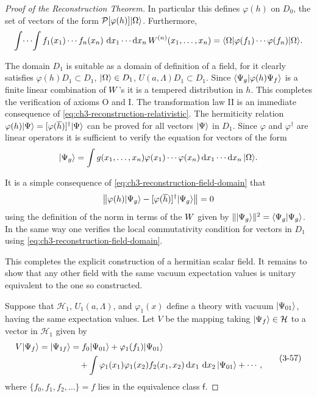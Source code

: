 \begin{proof}[Proof of the Reconstruction Theorem]
In particular this defines \(\varphi(h)\) on \(D_0\), the set of vectors of
the form \(\mathcal{P}[\varphi(h)]\lvert \Omega\rangle\).  Furthermore,
\begin{equation*}
\int\!\cdots\!\int f_1(x_1)\cdots f_n(x_n)\,
\mathop{}\!\mathrm{d} x_1\cdots\mathop{}\!\mathrm{d} x_n\,W^{(n)}(x_1,\ldots,x_n)
 =\langle \Omega\rvert\varphi(f_1)\cdots\varphi(f_n)\lvert \Omega\rangle .
\end{equation*}

The domain \(D_1\) is suitable as a domain of definition of a field, for it
clearly satisfies \(\varphi(h)D_1\subset D_1\),
\(\lvert \Omega\rangle\in D_1\), \(U(a,\Lambda)D_1\subset D_1\).  Since
\(\langle \Psi_g\vert \varphi(h)\Psi_f\rangle\) is a finite linear combination of
\(W\)'s it is a tempered distribution in \(h\).  This completes the
verification of axioms O and I.  The transformation law II is an immediate
consequence of \eqref{eq:ch3-reconstruction-relativistic}.  The hermiticity relation
\(\varphi(h)\lvert \Psi\rangle=[\varphi(\overline h)]^\dagger\lvert \Psi\rangle\) can be
proved for all vectors \(\lvert \Psi\rangle\) in \(D_1\).  Since \(\varphi\) and
\(\varphi^\dagger\) are linear operators it is sufficient to verify the
equation for vectors of the form
\begin{equation*}
\lvert \Psi_g\rangle
 =\int g(x_1,\ldots,x_n)\varphi(x_1)\cdots\varphi(x_n)
 \mathop{}\!\mathrm{d} x_1\cdots\mathop{}\!\mathrm{d} x_n\,\lvert \Omega\rangle .
\end{equation*}

It is a simple consequence of \eqref{eq:ch3-reconstruction-field-domain} that
\begin{equation*}
\left\lVert\varphi(h)\lvert \Psi_g\rangle
 -[\varphi(\overline h)]^\dagger\lvert \Psi_g\rangle\right\rVert=0
\end{equation*}
using the definition of the norm in terms of the \(W\) given by
\(\lVert\lvert \Psi_g\rangle\rVert^2=\langle \Psi_g\vert \Psi_g\rangle\).  In the same way
one verifies the local commutativity condition for vectors in \(D_1\) using
\eqref{eq:ch3-reconstruction-field-domain}.

This completes the explicit construction of a hermitian scalar field.  It
remains to show that any other field with the same vacuum expectation values
is unitary equivalent to the one so constructed.

Suppose that \(\mathcal H_1\), \(U_1(a,\Lambda)\), and \(\varphi_1(x)\) define a
theory with vacuum \(\lvert \Psi_{01}\rangle\), having the same expectation values.
Let \(V\) be the mapping taking \(\lvert \Psi_f\rangle\in\mathcal H\) to a vector in
\(\mathcal H_1\) given by
\begin{equation}
\begin{aligned}
V\lvert \Psi_f\rangle=\lvert \Psi_{1f}\rangle
 &=f_0\lvert \Psi_{01}\rangle+\varphi_1(f_1)\lvert \Psi_{01}\rangle\\
 &\quad+\int\varphi_1(x_1)\varphi_1(x_2)f_2(x_1,x_2)
 \mathop{}\!\mathrm{d} x_1\,\mathop{}\!\mathrm{d} x_2\,\lvert \Psi_{01}\rangle+\cdots ,
\end{aligned}
\tag{3-57}\label{eq:ch3-reconstruction-unitary-map}
\end{equation}
where \(\{f_0,f_1,f_2,\ldots\}=f\) lies in the equivalence class \(\mathsf f\).


\end{proof}
